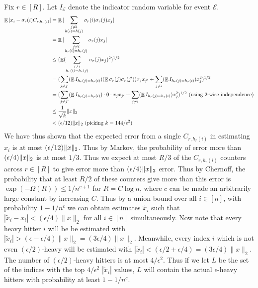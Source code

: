 \documentclass[11pt]{article}
\DeclareMathOperator*{\E}{\mathbb{E}}
\DeclarePairedDelimiter \norm {\|} {\|}
\begin{document}
Fix $r\in[R]$. Let $I_{\mathcal{E}}$ denote the indicator random variable for event $\mathcal{E}$.
\begin{align*}
\E |x_i - \sigma_r(i)C_{r,h_r(i)}| &= \E|\sum_{\substack{j \neq i\\h(i)=h(j)}} \sigma_r(i)\sigma_{r}(j) x_{j}|\\
{}&= \E|\sum_{\substack{j \neq i\\h_r(i)=h_r(j)}} \sigma_{r}(j) x_{j}|\\
{}&\le (\E(\sum_{\substack{j \neq i\\h_r(i)=h_r(j)}} \sigma_{r}(j) x_{j})^2)^{1/2}\\
{}&= (\sum_{j \neq j'} (\E I_{h_r(j) = h_r(i)}) (\E \sigma_r(j)\sigma_r(j'))x_{j}x_{j'} + \sum_{j \neq i} (\E I_{h_r(j) = h_r(i)}) x_{j}^{2})^{1/2} \\
{}&= (\sum_{j \neq j'} (\E I_{h_r(j) = h_r(i)})\cdot 0 \cdot x_{j}x_{j'} + \sum_{j \neq i} (\E I_{h_r(j) = h_r(i)}) x_{j}^{2})^{1/2} \text{ (using }2\text{-wise independence)}\\
{}&\leq \frac{1}{\sqrt{k}} \norm{x}_{2} \\
{}&< (\epsilon / 12) \norm{x}_{2} \text{ (picking } k = 144/\epsilon^2\text{)}\\
\end{align*}
We have thus shown that the expected error from a single $C_{r,h_r(i)}$ in estimating $x_i$ is at most $(\epsilon/12)\norm{x}_2$. Thus by Markov, the probability of error more than $(\epsilon/4)\norm{x}_2$ is at most $1/3$. Thus we expect at most $R/3$ of the $C_{r,h_r(i)}$ counters across $r\in[R]$ to give error more than $(\epsilon/4)\norm{x}_2$ error. Thus by Chernoff, the probability that at least $R/2$ of these counters give more than this error is $\exp(-\Omega(R)) \le 1/n^{c+1}$ for $R = C\log n$, where $c$ can be made an arbitrarily large constant by increasing $C$. Thus by a union bound over all $i\in[n]$, with probability $1 - 1/n^c$ we can obtain estimates $\tilde{x}_i$ such that $|\tilde{x}_i - x_i| < (\epsilon/4)\|x\|_2$ for all $i\in[n]$ simultaneously. Now note that every heavy hitter $i$ will be be estimated with $|\tilde{x}_i| > (\epsilon - \epsilon/4)\|x\|_2 = (3\epsilon/4)\|x\|_2$. Meanwhile, every index $i$ which is not even $(\epsilon/2)$-heavy will be estimated with $|\tilde{x}_i| < (\epsilon/2 + \epsilon/4) = (3\epsilon/4)\|x\|_2$. The number of $(\epsilon/2)$-heavy hitters is at most $4/\epsilon^2$. Thus if we let $L$ be the set of the indices with the top $4/\epsilon^2$ $|\tilde{x}_i|$ values, $L$ will contain the actual $\epsilon$-heavy hitters with probability at least $1 - 1/n^c$.
\end{document}
